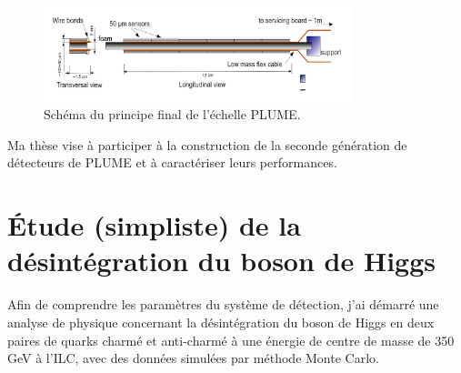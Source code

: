 \documentclass[a4papper, 10pt]{article}
\begin{document}
  \begin{figure}
    \centering
    \includegraphics[width = 0.8\textwidth]{Pictures/plume_finalGoal.png}
    \caption{Schéma du principe final de l'échelle PLUME.}
    \label{fig:PLUME}
  \end{figure}

  Ma thèse vise à participer à la construction de la seconde génération de détecteurs de PLUME et à caractériser leurs performances.

  \section{Étude (simpliste) de la désintégration du boson de Higgs}

  Afin de comprendre les paramètres du système de détection, j'ai démarré une analyse de physique concernant la désintégration du boson de Higgs en deux paires de quarks charmé et anti-charmé à une énergie de centre de masse de 350 GeV à l'ILC, avec des données simulées par méthode Monte Carlo.
\end{document}
